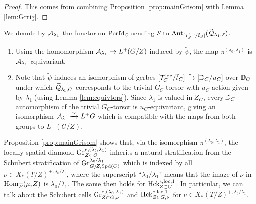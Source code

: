 \begin{proof}
     This comes from combining Proposition \ref{prop:mainGrisom} with Lemma \ref{lem:Grrig}.
\end{proof}

\begin{defi} We denote by $\mathcal{A}_{\lambda_{1}}$ the functor on $\mathrm{Perfd}_{C}$ sending $S$ to $\underline{\textnormal{Aut}}_{[\mathcal{T}_{S}^{\mathrm{loc}}/\tilde{t}_{S}]}(\widetilde{\mathcal{Q}}_{\lambda_{1},S})$. 
\end{defi}


\begin{rque}\label{rque:Alambda} \begin{enumerate}
    \item Using the homomorphism $\mathcal{A}_{\lambda_{1}} \to L^{+}(G/Z)$ induced by $\tilde{\psi}$, the map $\pi^{(\lambda_{0},\lambda_{1})}$ is $\mathcal{A}_{\lambda_{1}}$-equivariant. 

    \item Note that $\tilde{\psi}$ induces an isomorphism of gerbes $[\mathcal{T}_{C}^{\mathrm{loc}}/\tilde{t}_{C}] \xrightarrow{\sim} [\mathbb D_{C}/u_{C}]$ over $\mathbb D_{C}$ under which $\widetilde{\mathcal{Q}}_{\lambda_{1},C}$ corresponds to the trivial $G_{C}$-torsor with $u_{C}$-action given by $\lambda_{1}$ (using Lemma \ref{lem:equivtors}). Since $\lambda_{1}$ is valued in $Z_{G}$, every $\mathbb D_{C}$-automorphism of the trivial $G_{C}$-torsor is $u_{C}$-equivariant, giving an isomorphism $\mathcal{A}_{\lambda_{1}} \xrightarrow{\sim} L^{+}G$ which is compatible with the maps from both groups to $L^{+}(G/Z)$.

\end{enumerate}
\end{rque}


\begin{rque}\label{rque:strat}
    Proposition \ref{prop:mainGrisom} shows that, via the isomorphism $\pi^{(\lambda_{0},\lambda_{1})}$, the locally spatial diamond $\textnormal{Gr}_{Z \subset G}^{e,(\lambda_{0},\lambda_{1})}$ inherits a natural stratification from the Schubert stratification of $\textnormal{Gr}_{G/Z,\mathrm{Spd}(C)}^{\lambda_{0}/\lambda_{1}}$ which is indexed by all $\nu \in X_{*}(T/Z)^{+,\lambda_{0}/\lambda_{1}}$, where the superscript ``$\lambda_{0}/\lambda_{1}$'' means that the image of $\nu$ in $\mathrm{Hom}_{\overline{F}}(\mu, Z)$ is $\lambda_{0}/\lambda_{1}$. The same then holds for $\mathrm{Hck}_{Z \subset G}^{e,\mathrm{loc},1}$. In particular, we can talk about the Schubert cells $\textnormal{Gr}_{Z \subset G,\nu}^{e,(\lambda_{0},\lambda_{1})}$ and $\mathrm{Hck}_{Z \subset G,\nu}^{e,\mathrm{loc},1}$ for $\nu \in X_{*}(T/Z)^{+,\lambda_{0}/\lambda_{1}}$.
\end{rque}

